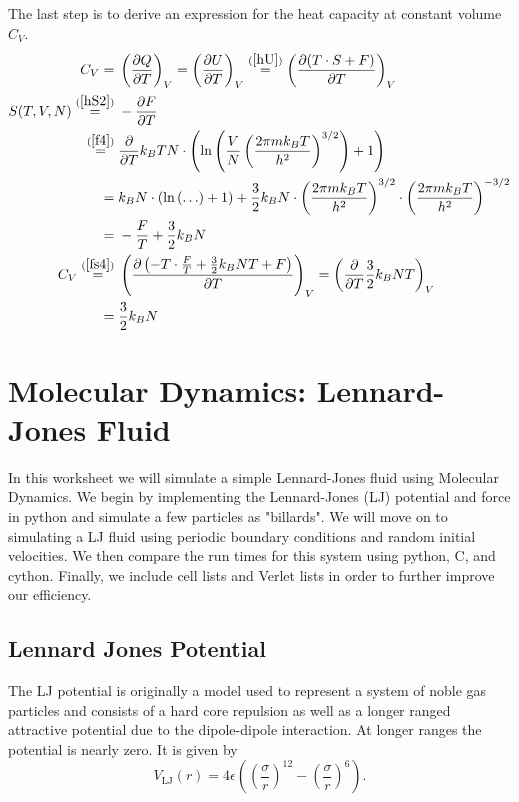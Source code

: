 \documentclass[11pt,a4paper]{scrartcl}
\newcommand{\pdiff}[2]{\frac{\partial #1}{\partial #2}} %
\newcommand{\Ln}[1]{\text{ln}\left( #1 \right)}			%
\newcommand{\eref}[1]{(\ref{#1})}						%
\begin{document}
The last step is to derive an expression for the heat capacity at constant volume $C_V$. 
\begin{align}
C_V 
	=&\; \left(\pdiff{Q}{T}\right)_V
	=\left(\pdiff{U}{T}\right)_V
	\stackrel{\eref{hU}}{=} \left(\pdiff{(T\cdot S+F)}{T}\right)_V
	\label{cv1}\\
S(T,V,N)
	\stackrel{\eref{hS2}}{=}&\; -\pdiff{F}{T}
	\label{fs1}\\
\stackrel{\eref{f4}}{=}&\; \pdiff{ }{T} k_BTN\cdot\left(\Ln{\frac{V}{N}\left(\frac{2\pi mk_BT}{h^2}\right)^{3/2}}+1\right)
	\label{fs2}\\
=&\; k_BN\cdot\left(\Ln{\ldots}+1\right)
	+ \frac{3}{2}k_BN\cdot\left(\frac{2\pi mk_BT}{h^2}\right)^{3/2}\cdot\left(\frac{2\pi mk_BT}{h^2}\right)^{-3/2}
	\label{fs3}\\
=&\; -\frac{F}{T} + \frac{3}{2}k_BN
	\label{fs4}\\
C_V
	\stackrel{\eref{fs4}}{=}&\; \left(\pdiff{\left( -T\cdot\frac{F}{T}+\frac{3}{2}k_BNT+F\right) }{T}\right)_V
	=\left(\pdiff{}{T}\frac{3}{2}k_BNT\right)_V
	\label{cv2}\\
=&\; \frac{3}{2}k_BN
	\label{cv3}
\end{align}

\section{Molecular Dynamics: Lennard-Jones Fluid}
In this worksheet we will simulate a simple Lennard-Jones fluid using Molecular Dynamics.  We begin by implementing the Lennard-Jones (LJ) potential and force in python and simulate a few particles as "billards". We will move on to simulating a LJ fluid using periodic boundary conditions and random initial velocities. We then compare the run times for this system using python, C, and cython. Finally, we include cell lists and Verlet lists in order to further improve our efficiency.
\subsection{Lennard Jones Potential}
The LJ potential is originally a model used to represent a system of noble gas particles and consists of a hard core repulsion as well as a longer ranged attractive potential due to the dipole-dipole interaction. At longer ranges the potential is nearly zero. It is given by
\begin{equation}
V_\mathrm{LJ}(r) = 4\epsilon\left(\left(\frac{\sigma}{r}\right)^{12} - \left(\frac{\sigma}{r}\right)^6\right).
\end{equation}
\end{document}
